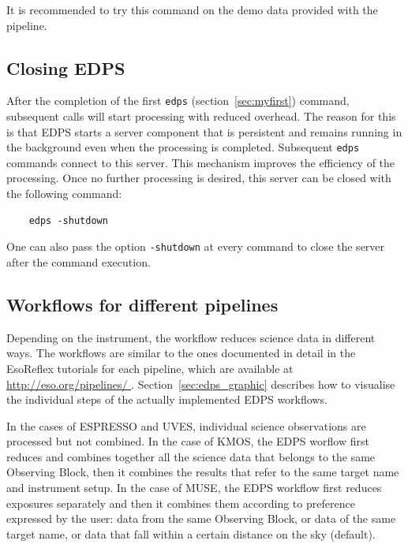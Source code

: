 It is recommended to try this command on the demo data provided with the pipeline. 


\subsection{Closing EDPS}
\label{sec:edps_close}

After the  completion of the first {\tt edps} (section~\ref{sec:myfirst}) command, subsequent calls will start processing with reduced overhead. The reason for this is that EDPS starts a server component that is persistent and remains running in the background even when the processing is completed. Subsequent {\tt edps} commands connect to this server. This mechanism improves the efficiency of the processing. Once no further processing is desired, this server can be closed with the following command:

\begin{verbatim}
    edps -shutdown
\end{verbatim}

One can also pass the option {\tt -shutdown} at every command to close the server after the command execution.




\subsection{Workflows for different pipelines}
 
Depending on the instrument, the workflow reduces science data in different ways. The workflows are similar to the ones documented in detail in the EsoReflex tutorials for each pipeline, which are available at {\url{http://eso.org/pipelines/ }}. Section~\ref{sec:edps_graphic} describes how  to visualise the individual steps of the actually implemented EDPS workflows.

In the cases of ESPRESSO and UVES, individual science observations are processed but not combined. In the case of KMOS, the EDPS worflow first reduces and combines together all the science data that belongs to the same Observing Block, then it combines the results that refer to the same target name and instrument setup. In the case of MUSE, the EDPS workflow first reduces exposures separately and then it combines them according to preference expressed by the user: data from the same Observing Block, or data of the same target name, or data that fall within a certain distance  on  the sky (default).

